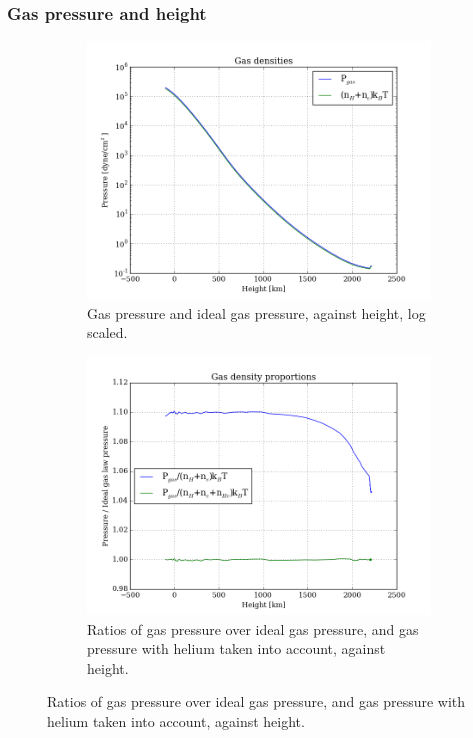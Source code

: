 \documentclass[11pt,a4paper,notitlepage]{article}
\begin{document}
\subsubsection{Gas pressure and height}

\begin{figure}[H]
\center

	\begin{subfigure}[t]{0.49\textwidth}
	\includegraphics[scale=0.42]{../figs/gasP_vs_h.png}
	\caption{Gas pressure and ideal gas pressure, against height, log scaled.}
	\end{subfigure}
	\hfill	
	\begin{subfigure}[t]{0.49\textwidth}
	\includegraphics[scale=0.42]{../figs/gasP_vs_h_ideal.png}
	\caption{Ratios of gas pressure over ideal gas pressure, and gas pressure with helium taken into account, against height.}
	\end{subfigure}
	

\end{figure}
\end{document}

